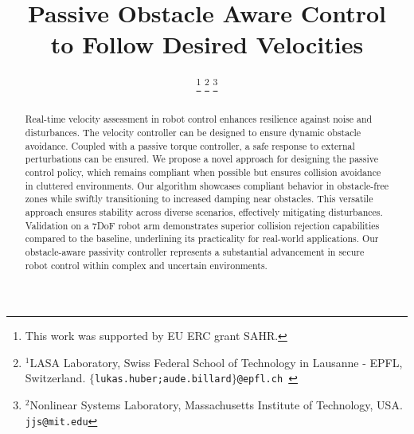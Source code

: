 \documentclass[conference]{IEEEtran}
\begin{document}
\newcommand{\vect}[1]{\boldsymbol{#1}}
\newcommand{\vecs}[1]{\boldsymbol{#1}}
\newcommand{\matr}[1]{\boldsymbol{#1}}
\newcommand{\matd}[1]{\mathcal{#1}}

\newcommand{\dotprod}[2]{\left\langle {#1}, \, {#2} \right\rangle}
\newcommand{\normdotprod}[2]{\frac{\left\langle #1, \, #2 \right\rangle}{\| #1 \| \, \| #2 \|}}


\newtheorem{theorem}{Theorem}[section]
\newtheorem{corollary}{Corollary}[section]
\newtheorem{lemma}{Lemma}[section]
\newtheorem{definition}{Definition}[section]


\title{
Passive Obstacle Aware Control \\
to Follow Desired Velocities
}

\author{
\thanks{This work was supported by EU ERC grant SAHR.} %
\thanks{$^{1}$LASA Laboratory, Swiss Federal School of Technology in Lausanne - EPFL, Switzerland. \tt $\{$lukas.huber;aude.billard$\}$@epfl.ch }
\thanks{$^{2}$Nonlinear Systems Laboratory,  Massachusetts Institute of Technology, USA. \tt jjs@mit.edu}   %
}


\maketitle
\thispagestyle{plain}
\pagestyle{plain}
    
\begin{abstract}
Real-time velocity assessment in robot control enhances resilience against noise and disturbances. The velocity controller can be designed to ensure dynamic obstacle avoidance. Coupled with a passive torque controller, a safe response to external perturbations can be ensured.
We propose a novel approach for designing the passive control policy, which remains compliant when possible but ensures collision avoidance in cluttered environments.
Our algorithm showcases compliant behavior in obstacle-free zones while swiftly transitioning to increased damping near obstacles. This versatile approach ensures stability across diverse scenarios, effectively mitigating disturbances.
Validation on a 7DoF robot arm demonstrates superior collision rejection capabilities compared to the baseline, underlining its practicality for real-world applications. Our obstacle-aware passivity controller represents a substantial advancement in secure robot control within complex and uncertain environments.
\end{abstract}
\end{document}
